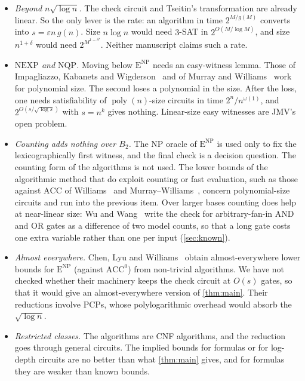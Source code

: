 \documentclass[10pt]{amsart}
\theoremstyle{plain}
\theoremstyle{definition}
\theoremstyle{remark}
\numberwithin{equation}{section}
\newcommand{\poly}{\operatorname{poly}}
\newcommand{\ENP}{\mathrm{E}^{\mathrm{NP}}}
\begin{document}
\begin{itemize}
\item \emph{Beyond $n\sqrt{\log n}$.} The check circuit and Tseitin's transformation are already
linear. So the only lever is the rate: an algorithm in time $2^{M/g(M)}$ converts into
$s=\varepsilon n\,g(n)$. Size $n\log n$ would need $3$-SAT in $2^{O(M/\log M)}$, and size
$n^{1+\delta}$ would need $2^{M^{1-\delta'}}$. Neither manuscript claims such a rate.
\item \emph{$\mathrm{NEXP}$ and $\mathrm{NQP}$.} Moving below $\ENP$ needs an easy-witness lemma.
Those of Impagliazzo, Kabanets and Wigderson~\cite{IKW02} and of Murray and Williams~\cite{MW18}
work for polynomial size. The second loses a polynomial in the size. After the loss, one needs
satisfiability of $\poly(n)$-size circuits in time $2^n/n^{\omega(1)}$, and $2^{O(s/\sqrt{\log s})}$
with $s=n^k$ gives nothing. Linear-size easy witnesses are JMV's open problem.
\item \emph{Counting adds nothing over $B_2$.} The $\mathrm{NP}$ oracle of $\ENP$ is used only to fix the
lexicographically first witness, and the final check is a decision question. The counting form of
the algorithms is not used. The lower bounds of the algorithmic method that do exploit counting or fast
evaluation, such as those against $\mathrm{ACC}$ of Williams~\cite{Wil14} and
Murray--Williams~\cite{MW18}, concern polynomial-size circuits and run into the previous item.
Over larger bases counting does help at near-linear size: Wu and Wang~\cite{WW26} write the check
for arbitrary-fan-in AND and OR gates as a difference of two model counts, so that a long gate
costs one extra variable rather than one per input (\cref{sec:known}).
\item \emph{Almost everywhere.} Chen, Lyu and Williams~\cite{CLW20} obtain almost-everywhere lower
bounds for $\ENP$ (against $\mathrm{ACC}^0$) from non-trivial algorithms. We have not checked whether
their machinery keeps the check circuit at $O(s)$ gates, so that it would give an almost-everywhere
version of \cref{thm:main}. Their reductions involve PCPs, whose polylogarithmic overhead would
absorb the $\sqrt{\log n}$.
\item \emph{Restricted classes.} The algorithms are CNF algorithms, and the reduction goes through
general circuits. The implied bounds for formulas or for log-depth circuits are no better than what
\cref{thm:main} gives, and for formulas they are weaker than known bounds.
\end{itemize}
\end{document}

